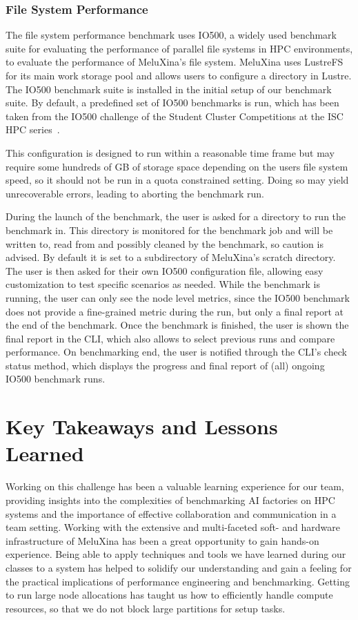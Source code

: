 \documentclass[conference,12pt]{IEEEtran}
\begin{document}
    \subsubsection{File System Performance}
    The file system performance benchmark uses IO500, a widely used benchmark suite for evaluating the performance of parallel file systems in HPC environments, to evaluate the performance of MeluXina's file system.
    MeluXina uses LustreFS for its main work storage pool and allows users to configure a directory in Lustre.
    The IO500 benchmark suite is installed in the initial setup of our benchmark suite.
    By default, a predefined set of IO500 benchmarks is run, which has been taken from the IO500 challenge of the Student Cluster Competitions at the ISC HPC series~\cite{ischpc}.

    This configuration is designed to run within a reasonable time frame but may require some hundreds of GB of storage space depending on the users file system speed, so it should not be run in a quota constrained setting. Doing so may yield unrecoverable errors, leading to aborting the benchmark run.

    During the launch of the benchmark, the user is asked for a directory to run the benchmark in.
    This directory is monitored for the benchmark job and will be written to, read from and possibly cleaned by the benchmark, so caution is advised. By default it is set to a subdirectory of MeluXina's scratch directory.
    The user is then asked for their own IO500 configuration file, allowing easy customization to test specific scenarios as needed.
    While the benchmark is running, the user can only see the node level metrics, since the IO500 benchmark does not provide a fine-grained metric during the run, but only a final report at the end of the benchmark. Once the benchmark is finished, the user is shown the final report in the CLI, which also allows to select previous runs and compare performance.
    On benchmarking end, the user is notified through the CLI's check status method, which displays the progress and final report of (all) ongoing IO500 benchmark runs.

    \section{Key Takeaways and Lessons Learned}

    Working on this challenge has been a valuable learning experience for our team, providing insights into the complexities of benchmarking AI factories on HPC systems and the importance of effective collaboration and communication in a team setting.
    Working with the extensive and multi-faceted soft- and hardware infrastructure of MeluXina has been a great opportunity to gain hands-on experience.
    Being able to apply techniques and tools we have learned during our classes to a system has helped to solidify our understanding and gain a feeling for the practical implications of performance engineering and benchmarking.
    Getting to run large node allocations has taught us how to efficiently handle compute resources, so that we do not block large partitions for setup tasks.
\end{document}
